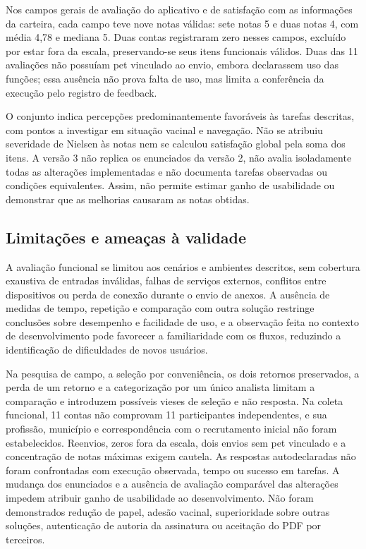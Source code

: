 \documentclass{UNESC}
\begin{document}
Nos campos gerais de avaliação do aplicativo e de satisfação com as informações da carteira, cada campo teve nove notas válidas: sete notas 5 e duas notas 4, com média 4,78 e mediana 5. Duas contas registraram zero nesses campos, excluído por estar fora da escala, preservando-se seus itens funcionais válidos. Duas das 11 avaliações não possuíam pet vinculado ao envio, embora declarassem uso das funções; essa ausência não prova falta de uso, mas limita a conferência da execução pelo registro de feedback.

O conjunto indica percepções predominantemente favoráveis às tarefas descritas, com pontos a investigar em situação vacinal e navegação. Não se atribuiu severidade de Nielsen às notas nem se calculou satisfação global pela soma dos itens. A versão 3 não replica os enunciados da versão 2, não avalia isoladamente todas as alterações implementadas e não documenta tarefas observadas ou condições equivalentes. Assim, não permite estimar ganho de usabilidade ou demonstrar que as melhorias causaram as notas obtidas.

\FloatBarrier
\subsection{Limitações e ameaças à validade}

A avaliação funcional se limitou aos cenários e ambientes descritos, sem cobertura exaustiva de entradas inválidas, falhas de serviços externos, conflitos entre dispositivos ou perda de conexão durante o envio de anexos. A ausência de medidas de tempo, repetição e comparação com outra solução restringe conclusões sobre desempenho e facilidade de uso, e a observação feita no contexto de desenvolvimento pode favorecer a familiaridade com os fluxos, reduzindo a identificação de dificuldades de novos usuários.

Na pesquisa de campo, a seleção por conveniência, os dois retornos preservados, a perda de um retorno e a categorização por um único analista limitam a comparação e introduzem possíveis vieses de seleção e não resposta. Na coleta funcional, 11 contas não comprovam 11 participantes independentes, e sua profissão, município e correspondência com o recrutamento inicial não foram estabelecidos. Reenvios, zeros fora da escala, dois envios sem pet vinculado e a concentração de notas máximas exigem cautela. As respostas autodeclaradas não foram confrontadas com execução observada, tempo ou sucesso em tarefas. A mudança dos enunciados e a ausência de avaliação comparável das alterações impedem atribuir ganho de usabilidade ao desenvolvimento. Não foram demonstrados redução de papel, adesão vacinal, superioridade sobre outras soluções, autenticação de autoria da assinatura ou aceitação do PDF por terceiros.
\end{document}

